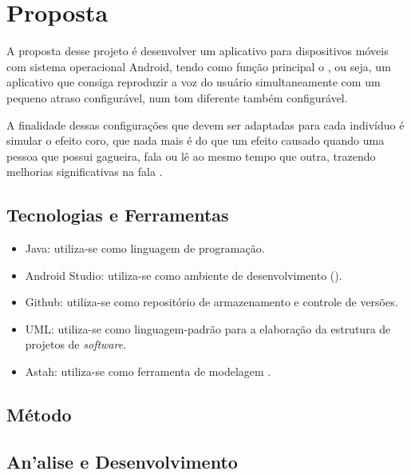 \chapter{Proposta}

A proposta desse projeto \'e desenvolver um aplicativo para dispositivos m\'oveis com sistema operacional Android, tendo como fun\c{c}\~ao principal o , ou seja, um aplicativo que consiga reproduzir a voz do usu\'ario simultaneamente com um pequeno atraso configur\'avel, num tom diferente tamb\'em configur\'avel. 

A finalidade dessas configura\c{c}\~oes que devem ser adaptadas para cada indiv\'iduo \'e simular o efeito coro, que nada mais \'e do que um efeito causado quando uma pessoa que possui gagueira, fala ou l\^e ao mesmo tempo que outra, trazendo melhorias significativas na fala \cite{Udemo2008}.

\section{Tecnologias e Ferramentas}
\begin{itemize}
	
	\item Java: utiliza-se como linguagem de programa\c{c}\~ao.
	
	\item Android Studio: utiliza-se como ambiente de desenvolvimento 		().

	\item Github: utiliza-se como reposit\'orio de armazenamento e controle de vers\~oes.

	\item UML: utiliza-se como linguagem-padr\~ao para a elabora\c{c}\~ao da estrutura de projetos de \textit{software}.

	\item Astah: utiliza-se como ferramenta de modelagem . 

\end{itemize}

\section{M\'etodo}

\section{An'alise e Desenvolvimento}

